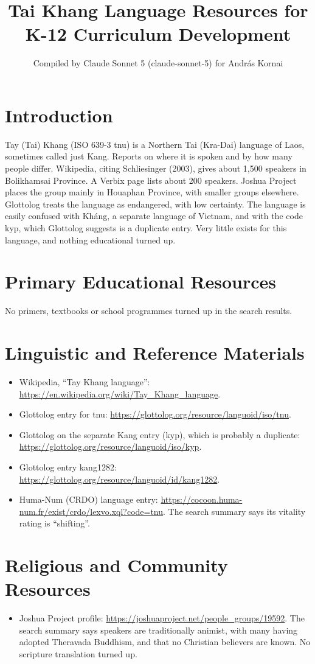 \documentclass[12pt]{article}
\title{Tai Khang Language Resources for K-12 Curriculum Development}
\author{Compiled by Claude Sonnet 5 (claude-sonnet-5) for Andr\'as Kornai}
\date{}
\begin{document}
\maketitle

\section{Introduction}
Tay (Tai) Khang (ISO 639-3 tnu) is a Northern Tai (Kra-Dai) language of Laos, sometimes called just Kang. Reports on where it is spoken and by how many people differ. Wikipedia, citing Schliesinger (2003), gives about 1,500 speakers in Bolikhamsai Province. A Verbix page lists about 200 speakers. Joshua Project places the group mainly in Houaphan Province, with smaller groups elsewhere. Glottolog treats the language as endangered, with low certainty. The language is easily confused with Kh\'ang, a separate language of Vietnam, and with the code kyp, which Glottolog suggests is a duplicate entry. Very little exists for this language, and nothing educational turned up.

\section{Primary Educational Resources}
No primers, textbooks or school programmes turned up in the search results.

\section{Linguistic and Reference Materials}
\begin{itemize}
\item Wikipedia, ``Tay Khang language'': \url{https://en.wikipedia.org/wiki/Tay_Khang_language}.
\item Glottolog entry for tnu: \url{https://glottolog.org/resource/languoid/iso/tnu}.
\item Glottolog on the separate Kang entry (kyp), which is probably a duplicate: \url{https://glottolog.org/resource/languoid/iso/kyp}.
\item Glottolog entry kang1282: \url{https://glottolog.org/resource/languoid/id/kang1282}.
\item Huma-Num (CRDO) language entry: \url{https://cocoon.huma-num.fr/exist/crdo/lexvo.xql?code=tnu}. The search summary says its vitality rating is ``shifting''.
\end{itemize}

\section{Religious and Community Resources}
\begin{itemize}
\item Joshua Project profile: \url{https://joshuaproject.net/people_groups/19592}. The search summary says speakers are traditionally animist, with many having adopted Theravada Buddhism, and that no Christian believers are known. No scripture translation turned up.
\end{itemize}
\end{document}
